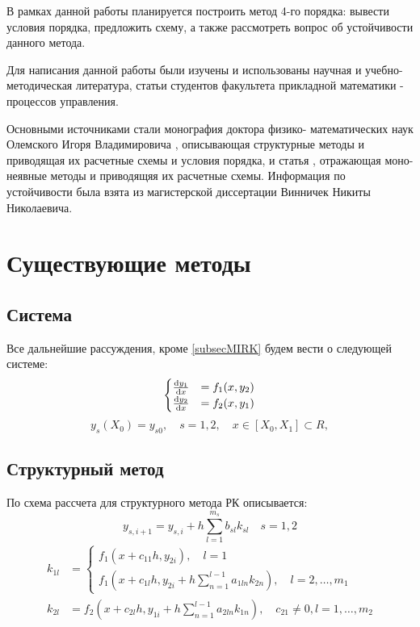 \documentclass[a4paper,article,14pt]{extarticle}
\begin{document}
В рамках данной работы планируется построить метод 4-го порядка: вывести условия порядка, предложить схему, а также рассмотреть вопрос об устойчивости данного метода. 
\pagebreak

Для написания данной работы были изучены и использованы научная и учебно-методическая литература, статьи студентов факультета прикладной математики - процессов управления.

Основными источниками стали монография доктора физико-
математических наук Олемского Игоря Владимировича \cite{srk}, описывающая структурные методы и приводящая их расчетные схемы и условия порядка, и статья \cite{mirk}, отражающая моно-неявные методы и приводящяя их расчетные схемы. Информация по устойчивости была взята из магистерской диссертации Винничек Никиты Николаевича.
\pagebreak

\section{Существующие методы}
\subsection{Система}
Все дальнейшие рассуждения, кроме \ref{subsecMIRK} будем вести о следующей системе:
\begin{equation}
\begin{cases}
         \dv{y_1}{x} &= f_1(x,y_2) \\
         \dv{y_2}{x} &= f_2(x,y_1)
\end{cases}
\label{eq:base_system}
\end{equation}
\begin{equation}
    y_{s}(X_{0}) = y_{s0}, \quad s = 1,2, \quad x \in [X_{0},X_{1}] \subset R,
\end{equation}
\subsection{Структурный метод}
По \cite{srk} схема рассчета для структурного метода РК описывается:
\begin{equation}
    y_{s,i+1} = y_{s,i} + h \sum_{l=1}^{m_{s}} b_{sl} k_{sl} \quad s = 1, 2 
\end{equation}
\begin{equation}
\begin{aligned}
    k_{1l} &= 
\begin{cases}
    f_{1}(x + c_{11} h, y_{2i}), \quad l = 1 \\
    f_{1}(x + c_{1l} h, y_{2i} + h \sum_{n=1}^{l-1} a_{1ln} k_{2n}), \quad l = 2, \dotsc, m_{1}
\end{cases}
    \\k_{2l} &= 
    f_{2}(x + c_{2l} h, y_{1i} + h \sum_{n=1}^{l-1} a_{2ln} k_{1n}), \quad c_{21} \not= 0, l = 1, \dotsc, m_{2}
\end{aligned}
\end{equation}
\end{document}
